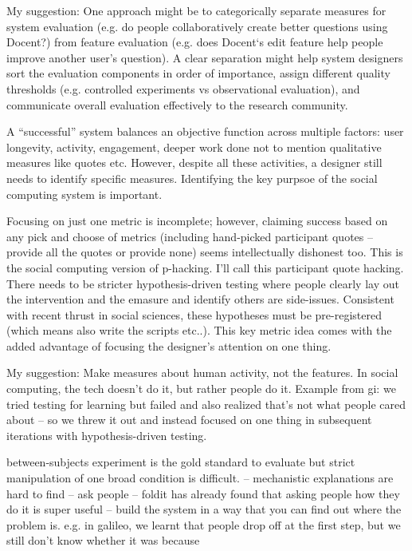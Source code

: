 My suggestion: One approach might be to categorically separate measures for system evaluation (e.g. do people collaboratively create better questions using Docent?) from feature evaluation (e.g. does Docent‘s edit feature help people improve another user’s question). A clear separation might help system designers sort the evaluation components in order of importance, assign different quality thresholds (e.g. controlled experiments vs observational evaluation), and communicate overall evaluation effectively to the research community.

A “successful” system balances an objective function across multiple factors: user longevity, activity, engagement, deeper work done not to mention qualitative measures like quotes etc. However, despite all these activities, a designer still needs to identify specific measures. Identifying the key purpsoe of the social computing system is important. 

Focusing on just one metric is incomplete; however, claiming success based on any pick and choose of metrics (including hand-picked participant quotes -- provide all the quotes or provide none) seems intellectually dishonest too. This is the social computing version of p-hacking. I'll call this participant quote hacking. There needs to be stricter hypothesis-driven testing where people clearly lay out the intervention and the emasure and identify others are side-issues. Consistent with recent thrust in social sciences, these hypotheses must be pre-registered (which means also write the scripts etc..). This key metric idea comes with the added advantage of focusing the designer's attention on one thing.

My suggestion: Make measures about human activity, not the features. In social computing, the tech doesn't do it, but rather people do it. Example from gi: we tried testing for learning but failed and also realized that's not what people cared about -- so we threw it out and instead focused on one thing in subsequent iterations with hypothesis-driven testing. 

between-subjects experiment is the gold standard to evaluate but strict manipulation of one broad condition is difficult. 
-- mechanistic explanations are hard to find
-- ask people -- foldit has already found that asking people how they do it is super useful
-- build the system in a way that you can find out where the problem is. e.g. in galileo, we learnt that people drop off at the first step, but we still don't know whether it was because 

